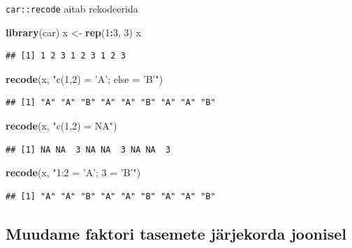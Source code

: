 \documentclass[]{book}
\newenvironment{Shaded}{\begin{snugshade}}{\end{snugshade}}
\newcommand{\KeywordTok}[1]{\textcolor[rgb]{0.13,0.29,0.53}{\textbf{#1}}}
\newcommand{\DecValTok}[1]{\textcolor[rgb]{0.00,0.00,0.81}{#1}}
\newcommand{\StringTok}[1]{\textcolor[rgb]{0.31,0.60,0.02}{#1}}
\newcommand{\OperatorTok}[1]{\textcolor[rgb]{0.81,0.36,0.00}{\textbf{#1}}}
\newcommand{\NormalTok}[1]{#1}
\begin{document}
\texttt{car::recode} aitab rekodeerida

\begin{Shaded}
\begin{Highlighting}[]
\KeywordTok{library}\NormalTok{(car) }
\NormalTok{x <-}\StringTok{ }\KeywordTok{rep}\NormalTok{(}\DecValTok{1}\OperatorTok{:}\DecValTok{3}\NormalTok{, }\DecValTok{3}\NormalTok{)}
\NormalTok{x}
\end{Highlighting}
\end{Shaded}

\begin{verbatim}
## [1] 1 2 3 1 2 3 1 2 3
\end{verbatim}

\begin{Shaded}
\begin{Highlighting}[]
\KeywordTok{recode}\NormalTok{(x, }\StringTok{"c(1,2) = 'A'; else = 'B'"}\NormalTok{)}
\end{Highlighting}
\end{Shaded}

\begin{verbatim}
## [1] "A" "A" "B" "A" "A" "B" "A" "A" "B"
\end{verbatim}

\begin{Shaded}
\begin{Highlighting}[]
\KeywordTok{recode}\NormalTok{(x, }\StringTok{"c(1,2) = NA"}\NormalTok{)}
\end{Highlighting}
\end{Shaded}

\begin{verbatim}
## [1] NA NA  3 NA NA  3 NA NA  3
\end{verbatim}

\begin{Shaded}
\begin{Highlighting}[]
\KeywordTok{recode}\NormalTok{(x, }\StringTok{"1:2 = 'A'; 3 = 'B'"}\NormalTok{)}
\end{Highlighting}
\end{Shaded}

\begin{verbatim}
## [1] "A" "A" "B" "A" "A" "B" "A" "A" "B"
\end{verbatim}

\subsection{Muudame faktori tasemete järjekorda
joonisel}\label{muudame-faktori-tasemete-jarjekorda-joonisel}
\end{document}
